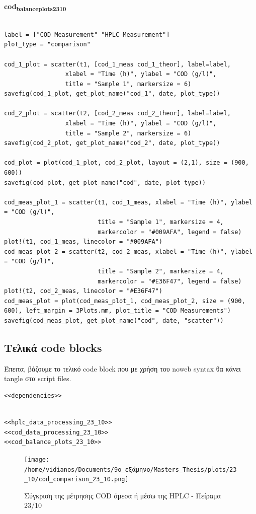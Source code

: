 \documentclass[11pt]{article}
\begin{document}
\textbf{cod\textsubscript{balance}\textsubscript{plots}\textsubscript{23}\textsubscript{10}}
\begin{verbatim}

label = ["COD Measurement" "HPLC Measurement"]
plot_type = "comparison"

cod_1_plot = scatter(t1, [cod_1_meas cod_1_theor], label=label,
                 xlabel = "Time (h)", ylabel = "COD (g/l)",
                 title = "Sample 1", markersize = 6)
savefig(cod_1_plot, get_plot_name("cod_1", date, plot_type))

cod_2_plot = scatter(t2, [cod_2_meas cod_2_theor], label=label,
                 xlabel = "Time (h)", ylabel = "COD (g/l)",
                 title = "Sample 2", markersize = 6)
savefig(cod_2_plot, get_plot_name("cod_2", date, plot_type))

cod_plot = plot(cod_1_plot, cod_2_plot, layout = (2,1), size = (900, 600))
savefig(cod_plot, get_plot_name("cod", date, plot_type))

cod_meas_plot_1 = scatter(t1, cod_1_meas, xlabel = "Time (h)", ylabel = "COD (g/l)",
                          title = "Sample 1", markersize = 4,
                          markercolor = "#009AFA", legend = false)
plot!(t1, cod_1_meas, linecolor = "#009AFA")
cod_meas_plot_2 = scatter(t2, cod_2_meas, xlabel = "Time (h)", ylabel = "COD (g/l)",
                          title = "Sample 2", markersize = 4,
                          markercolor = "#E36F47", legend = false)
plot!(t2, cod_2_meas, linecolor = "#E36F47")
cod_meas_plot = plot(cod_meas_plot_1, cod_meas_plot_2, size = (900, 600), left_margin = 3Plots.mm, plot_title = "COD Measurements")
savefig(cod_meas_plot, get_plot_name("cod", date, "scatter"))
\end{verbatim}

\subsection{Τελικά code blocks}
\label{sec:org063d8af}
Έπειτα, βάζουμε το τελικό code block που με χρήση του noweb syntax θα κάνει tangle στα script files.

\begin{verbatim}
<<dependencies>>
\end{verbatim}

\begin{verbatim}

<<hplc_data_processing_23_10>>
<<cod_data_processing_23_10>>
<<cod_balance_plots_23_10>>

\end{verbatim}

\begin{figure}[htbp]
\centering
\texttt{[image: /home/vidianos/Documents/9o\_εξάμηνο/Masters\_Thesis/plots/23\_10/cod\_comparison\_23\_10.png]}
\caption{Σύγκριση της μέτρησης COD άμεσα ή μέσω της HPLC - Πείραμα 23/10}
\end{figure}
\end{document}
